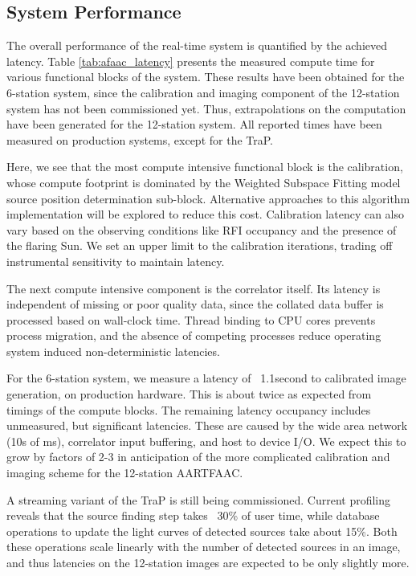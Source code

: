 \documentclass{ws-jai}
\begin{document}
\subsection {System Performance}
 The overall performance of the real-time
system  is quantified  by  the achieved  latency. Table  \ref{tab:afaac_latency}
presents  the  measured  compute  time  for various  functional  blocks  of  the
system. These  results have been  obtained for  the 6-station system,  since the
calibration  and  imaging  component  of  the 12-station  system  has  not  been
commissioned yet.  Thus, extrapolations on  the computation have  been generated
for the 12-station  system. All reported times have been  measured on production
systems, except for the TraP.

Here,  we  see  that  the  most   compute  intensive  functional  block  is  the
calibration,  whose compute  footprint  is dominated  by  the Weighted  Subspace
Fitting model source position determination sub-block. Alternative approaches to
this algorithm implementation will be  explored to reduce this cost. Calibration
latency can also  vary based on the observing conditions  like RFI occupancy and
the  presence of  the flaring  Sun. We  set an  upper limit  to the  calibration
iterations, trading off instrumental sensitivity to maintain latency.

The next  compute intensive component is  the correlator itself. Its  latency is
independent of missing  or poor quality data, since the  collated data buffer is
processed based on wall-clock time. Thread binding to CPU cores prevents process
migration,  and  the absence  of  competing  processes reduce  operating  system
induced non-deterministic latencies.

For the 6-station system, we measure a latency of ~1.1second to calibrated image
generation, on production hardware. This is about twice as expected from timings
of the compute blocks. The  remaining latency occupancy includes unmeasured, but
significant latencies.  These are caused by  the wide area network  (10s of ms),
correlator input buffering,  and host to device  I/O. We expect this  to grow by
factors of 2-3  in anticipation of the more complicated  calibration and imaging
scheme for the 12-station AARTFAAC.

A streaming variant  of the TraP is still being  commissioned. Current profiling
reveals that  the source finding step  takes ~30\% of user  time, while database
operations to update the light curves  of detected sources take about 15\%. Both
these operations scale linearly with the number of detected sources in an image,
and thus  latencies on the  12-station images are  expected to be  only slightly
more.\\
\end{document}
